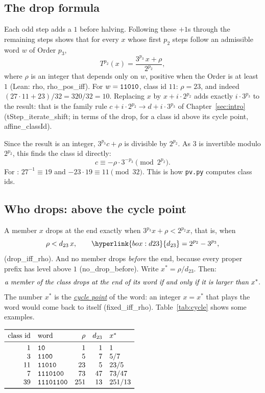 \documentclass[11pt,a4paper,titlepage]{article}
\makeatletter
\newcommand{\termhere}[1]{\leavevmode
  \Hy@raisedlink{\hyper@anchorstart{term:#1}\hyper@anchorend}}
\newcommand{\keyterm}[2]{\hyperlink{box:#1}{\emph{#2}}}
\newcommand{\keysym}[2]{\hyperlink{box:#1}{#2}}
\newcommand{\lean}[1]{\textsf{#1}}
\newenvironment{herefloat}[1]
  {\par\addvspace{\intextsep}\noindent\begin{minipage}{\linewidth}%
   \def\@captype{#1}\centering}
  {\end{minipage}\par\nopagebreak\vspace{\intextsep}}
\makeatother
\begin{document}
\subsection*{The drop formula}
\label{sec:dropformula}

\termhere{rho}Each odd step adds a $1$ before halving. Following these $+1$s through the
remaining steps shows that for every $x$ whose first $p_2$ steps follow an
admissible word $w$ of Order $p_3$,
\[
T^{p_2}(x) = \frac{3^{p_3}\,x + \rho}{2^{p_2}},
\]
where \keysym{rho}{$\rho$} is an integer that depends only on $w$, positive when the Order
is at least $1$ (Lean: \lean{rho}, \lean{rho\_pos\_iff}). For $w = \text{\texttt{11010}}$, class id $11$: $\rho = 23$, and indeed
$(27\cdot 11 + 23)/32 = 320/32 = 10$. Replacing $x$ by $x + i\cdot 2^{p_2}$
adds exactly $i\cdot 3^{p_3}$ to the result: that is the family rule
$c + i\cdot 2^{p_2} \to d + i\cdot 3^{p_3}$ of Chapter~\ref{sec:intro}
(\lean{tStep\_iterate\_shift}; in terms of the drop, for a class id above its
cycle point, \lean{affine\_classId}).

\nopagebreak
Since the result is an integer, $3^{p_3}c + \rho$ is divisible by $2^{p_2}$. As $3$ is
invertible modulo $2^{p_2}$, this finds the class id directly:
\[
c \equiv -\rho \cdot 3^{-p_3} \pmod{2^{p_2}}.
\]
For : $27^{-1} \equiv 19$ and $-23 \cdot 19 \equiv 11 \pmod{32}$. This is
how \texttt{pv.py} computes class ids.

\subsection*{Who drops: above the cycle point}

\termhere{d23}A member $x$ drops at the end exactly when $3^{p_3} x + \rho < 2^{p_2} x$, that
is, when
\[
\rho < d_{23}\, x, \qquad \keysym{d23}{d_{23}} = 2^{p_2} - 3^{p_3},
\]
(\lean{drop\_iff\_rho}). And no member drops \emph{before} the end, because
every proper prefix has level above $1$ (\lean{no\_drop\_before}). \termhere{cyclepoint}Write
$x^* = \rho / d_{23}$. Then:
\[
\text{\emph{a member of the class drops at the end of its word
if and only if it is larger than $x^*$.}}
\]
The number $x^*$ is the \keyterm{cyclepoint}{cycle point} of the word: an integer $x = x^*$
that plays the word would come back to itself
(\lean{fixed\_iff\_rho}). Table~\ref{tab:cycle} shows some examples.

\nopagebreak
\begin{herefloat}{table}
$\begin{array}{r l r r l}
\toprule
\text{class id} & \text{word} & \rho & d_{23} & x^* \\
\midrule
1 & \bw{10} & 1 & 1 & 1 \\
3 & \bw{1100} & 5 & 7 & 5/7 \\
11 & \bw{11010} & 23 & 5 & 23/5 \\
7 & \bw{1110100} & 73 & 47 & 73/47 \\
39 & \bw{11101100} & 251 & 13 & 251/13 \\
\bottomrule
\end{array}$
\caption{Cycle points $x^* = \rho/d_{23}$ of the first words.}
\label{tab:cycle}
\end{herefloat}
\end{document}
